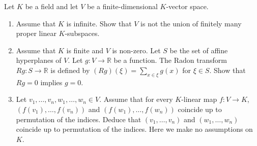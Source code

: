\begin{exercise}
\label{algebra:2018:4}
Let $K$ be a field and let $V$ be a finite-dimensional $K$-vector space.

\begin{enumerate}
\item Assume that $K$ is infinite. Show that $V$ is not the union of finitely many proper linear $K$-subspaces.

\item Assume that $K$ is finite and $V$ is non-zero. Let $S$ be the set of affine hyperplanes of $V$. Let $g: V \to \mathbb{R}$ be a function. The Radon transform $Rg: S \to \mathbb{R}$ is defined by $(Rg)(\xi) = \sum_{x \in \xi} g(x)$ for $\xi \in S$. Show that $Rg = 0$ implies $g = 0$.

\item Let $v_1, \ldots, v_n, w_1, \ldots, w_n \in V$. Assume that for every $K$-linear map $f: V \to K$, $(f(v_1), \ldots, f(v_n))$ and $(f(w_1), \ldots, f(w_n))$ coincide up to permutation of the indices. Deduce that $(v_1, \ldots, v_n)$ and $(w_1, \ldots, w_n)$ coincide up to permutation of the indices. Here we make no assumptions on $K$.
\end{enumerate}
\end{exercise}
